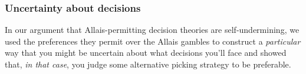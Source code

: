 \documentclass[a4paper]{article}
\newcommand{\todoinfo}[2][]{\todo[backgroundcolor=orange!80,bordercolor=black,linecolor=gray!80, #1,inline,caption={}]{#2}}
\renewcommand{\color}[1]{}
\newenvironment{CCM rewritten}
{\begingroup\color{blue}} %
{\endgroup}              %
\begin{document}
%
%


\subsubsection{Uncertainty about decisions}\label{sect:reu:other mu}

In our argument that Allais-permitting decision theories are self-undermining, we used the preferences they permit over the Allais gambles to construct a \textit{particular} way that you might be uncertain about what decisions you'll face and showed that, \textit{in that case}, you judge some alternative picking strategy to be preferable. 
\end{document}
